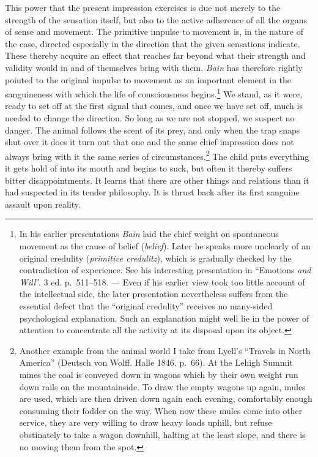 \documentclass[12pt,a4paper]{book}
\newcommand{\opage}[1]{\marginnote{\footnotesize\textit{[#1]}}}
\begin{document}
This power that the present impression exercises is due not merely to the
strength of the sensation itself, but also to the active adherence of all
the organs of sense and movement. The primitive impulse to movement is, in
the nature of the case, directed especially in the direction that the
given sensations indicate. These thereby acquire an effect that reaches
far beyond what their strength and validity would in and of themselves
bring with them. \emph{Bain} has therefore rightly pointed to the original
impulse to movement as an important element in the sanguineness with which
the life of consciousness begins.\footnote{In his earlier presentations
\emph{Bain} laid the chief weight on spontaneous movement as the cause of
belief (\textit{belief}). Later he speaks more unclearly of an original
credulity (\textit{primitive credulitz}), which is gradually checked by the
contradiction of experience. See his interesting presentation in
``Emotions \emph{and Will}''. 3 ed. p.~511--518. --- Even if his earlier
view took too little account of the intellectual side, the later
presentation nevertheless suffers from the essential defect that the
``original credulity'' receives no many-sided psychological explanation.
Such an explanation might well lie in the power of attention to
concentrate all the activity at its disposal upon its object.}
\opage{161}We stand, as it were, ready to set off at the first signal that
comes, and once we have set off, much is needed to change the direction.
So long as we are not stopped, we suspect no danger. The animal follows
the scent of its prey, and only when the trap snaps shut over it does it
turn out that one and the same chief impression does not always bring
with it the same series of circumstances.\footnote{Another example from
the animal world I take from Lyell's ``Travels in North America''
(Deutsch von Wolff. Halle 1846. p.~66). At the Lehigh Summit mines the
coal is conveyed down in wagons which by their own weight run down rails
on the mountainside. To draw the empty wagons up again, mules are used,
which are then driven down again each evening, comfortably enough
consuming their fodder on the way. When now these mules come into other
service, they are very willing to draw heavy loads uphill, but refuse
obstinately to take a wagon downhill, halting at the least slope, and
there is no moving them from the spot.} The child puts everything it gets
hold of into its mouth and begins to suck, but often it thereby suffers
bitter disappointments. It learns that there are other things and
relations than it had suspected in its tender philosophy. It is thrust
back after its first sanguine assault upon reality.
\end{document}
